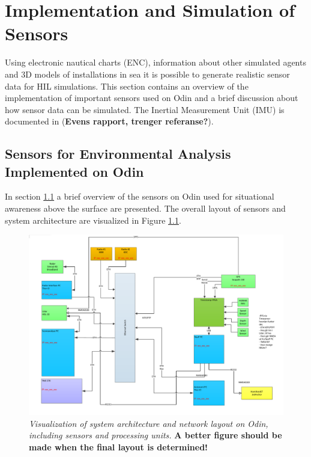 \chapter{Implementation and Simulation of Sensors}
Using electronic nautical charts (ENC), information about other simulated agents and 3D models of installations in sea it is possible to generate realistic sensor data for HIL simulations. This section contains an overview of the implementation of important sensors used on Odin and a brief discussion about how sensor data can be simulated. The Inertial Measurement Unit (IMU) is documented in (\textbf{Evens rapport, trenger referanse?}).

\section{Sensors for Environmental Analysis Implemented on Odin}
\label{SensorOverview}
In section \ref{SensorOverview} a brief overview of the sensors on Odin used for situational awareness above the surface are presented. The overall layout of sensors and system architecture are visualized in Figure \ref{fig:systemArchitecture}.

\begin{figure}[H]
	\begin{center}
		\includegraphics[width = 1\linewidth]{fig/SystemarkitekturOdin.pdf}
		\caption{\textit{Visualization of system architecture and network layout on Odin, including sensors and processing units.} \textbf{A better figure should be made when the final layout is determined!}}
		\label{fig:systemArchitecture}
	\end{center}
\end{figure}

